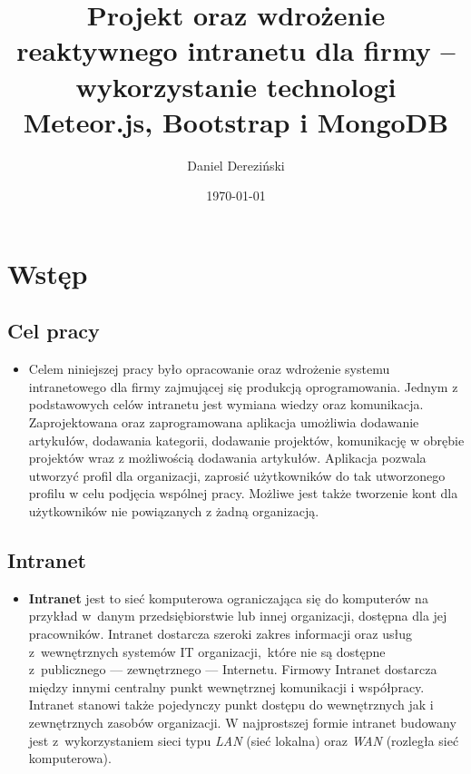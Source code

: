 \documentclass{beamer}
\title[]{Projekt oraz wdrożenie reaktywnego intranetu dla firmy – wykorzystanie technologi Meteor.js, Bootstrap i MongoDB}
\author{Daniel Dereziński}
\institute[]{Promotor:  prof. dr hab. Grzegorz Wójcik\\[12pt] Wyższa Szkoła Przedsiębiorczości i Innowacji w Lublinie}
\date{\today}
\newenvironment{justbe}%
{\setlength{\leftmargini}{0pt}\begin{itemize}\item[]}%
{\end{itemize}}
\begin{document}
\begin{frame}
\titlepage
\end{frame}
% 

\section{Wstęp}
\subsection{Cel pracy}

\begin{frame}
	\begin{justbe}
 	Celem niniejszej pracy było opracowanie oraz wdrożenie systemu intranetowego dla firmy zajmującej się produkcją oprogramowania. Jednym z podstawowych celów intranetu jest wymiana wiedzy oraz komunikacja. Zaprojektowana oraz zaprogramowana aplikacja umożliwia dodawanie artykułów, dodawania kategorii, dodawanie projektów, komunikację w obrębie projektów wraz z możliwością dodawania artykułów. Aplikacja pozwala utworzyć profil dla organizacji, zaprosić użytkowników do tak utworzonego profilu w celu podjęcia wspólnej pracy. Możliwe jest także tworzenie kont dla użytkowników nie powiązanych z żadną organizacją.
	\end{justbe}
\end{frame}

\subsection{Intranet}
\begin{frame}
	\begin{justbe}
		\textbf{Intranet} jest to sieć komputerowa ograniczająca się do komputerów na przykład w~danym przedsiębiorstwie lub innej organizacji, dostępna dla jej pracowników. Intranet dostarcza szeroki zakres informacji oraz usług z~wewnętrznych systemów IT organizacji,~które nie są dostępne z~publicznego --- zewnętrznego --- Internetu. Firmowy Intranet dostarcza między innymi centralny punkt wewnętrznej komunikacji i współpracy. Intranet stanowi także pojedynczy punkt dostępu do wewnętrznych jak i zewnętrznych zasobów organizacji. W najprostszej formie intranet budowany jest z~wykorzystaniem sieci typu \emph{LAN} (sieć lokalna) oraz \emph{WAN} (rozległa sieć komputerowa).
	\end{justbe}
\end{frame}
\end{document}
